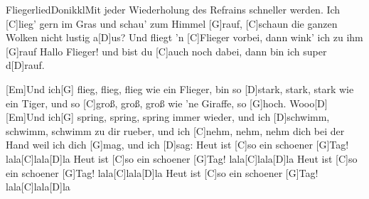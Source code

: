 \documentclass[../main.tex]{subfiles}
\begin{document}
\begin{song}[2]{Fliegerlied}{Donikkl}{Mit jeder Wiederholung des Refrains schneller werden.}
Ich [C]lieg' gern im Gras und schau' zum Himmel [G]rauf,
[C]schaun die ganzen Wolken nicht lustig a[D]us?
Und fliegt 'n [C]Flieger vorbei, dann wink' ich zu ihm [G]rauf     Hallo Flieger!
und bist du [C]auch noch dabei, dann bin ich super d[D]rauf.

[Em]Und ich[G] flieg, flieg, flieg wie ein Flieger,
bin so [D]stark, stark, stark wie ein Tiger,
und so [C]groß, groß, groß wie 'ne Giraffe, so [G]hoch. Wooo[D]
[Em]Und ich[G] spring, spring, spring immer wieder,
und ich [D]schwimm, schwimm, schwimm zu dir rueber,
und ich [C]nehm, nehm, nehm dich bei der Hand weil ich dich [G]mag, und ich [D]sag:
Heut ist [C]so ein schoener [G]Tag! lala[C]lala[D]la
Heut ist [C]so ein schoener [G]Tag! lala[C]lala[D]la
Heut ist [C]so ein schoener [G]Tag! lala[C]lala[D]la
Heut ist [C]so ein schoener [G]Tag! lala[C]lala[D]la
\end{song}
\end{document}
